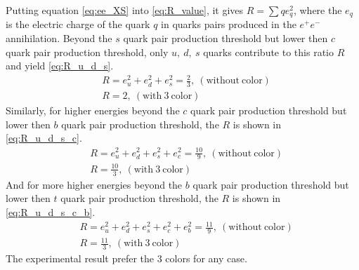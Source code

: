 Putting equation \ref{eq:ee_XS} into \ref{eq:R_value}, it gives $R=\sum{q}e_{q}^{2}$, where the $e_{q}$ is the electric charge of the quark $q$ in quarks pairs produced in the $e^{+}e^{-}$ annihilation. Beyond the $s$ quark pair production threshold but lower then $c$ quark pair production threshold, only $u,~d,~s$ quarks contribute to this ratio $R$ and yield \ref{eq:R_u_d_s}.
\begin{equation}
\begin{split}
&R=e_{u}^{2}+e_{d}^{2}+e_{s}^{2}=\frac{2}{3},~\mathrm{(without~color)} \\
&R=2,~\mathrm{(with~3~color)}
\end{split}
\label{eq:R_u_d_s}
\end{equation}
Similarly, for higher energies beyond the $c$ quark pair production threshold but lower then $b$ quark pair production threshold, the $R$ is shown in \ref{eq:R_u_d_s_c}.
\begin{equation}
\begin{split}
&R=e_{u}^{2}+e_{d}^{2}+e_{s}^{2}+e_{c}^{2}=\frac{10}{9},~\mathrm{(without~color)} \\
&R=\frac{10}{3},~\mathrm{(with~3~color)}
\end{split}
\label{eq:R_u_d_s_c}
\end{equation}
And for more higher energies beyond the $b$ quark pair production threshold but lower then $t$ quark pair production threshold, the $R$ is shown in \ref{eq:R_u_d_s_c_b}.
\begin{equation}
\begin{split}
&R=e_{u}^{2}+e_{d}^{2}+e_{s}^{2}+e_{c}^{2}+e_{b}^{2}=\frac{11}{9},~\mathrm{(without~color)} \\
&R=\frac{11}{3},~\mathrm{(with~3~color)}
\end{split}
\label{eq:R_u_d_s_c_b}
\end{equation}
The experimental result prefer the 3 colors for any case.

